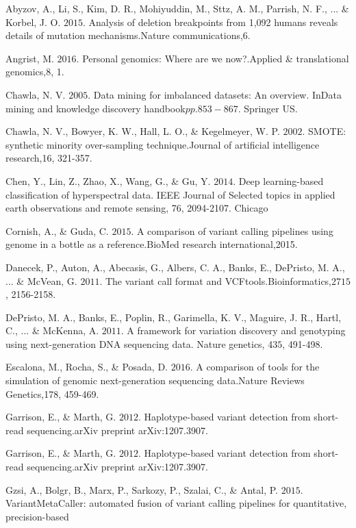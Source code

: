 \documentclass{article}
\begin{document}
\begin{list}{}{%
\setlength{\topsep}{0pt}%
\setlength{\leftmargin}{0.5in}%
\setlength{\listparindent}{-0.5in}%
\setlength{\itemindent}{-0.5in}%
\setlength{\parsep}{\parskip}%
}
\item[]\item[] Abyzov, A., Li, S., Kim, D. R., Mohiyuddin, M., Sttz, A. M., Parrish, N. F., ... \& Korbel, J. O. \(2015\). Analysis of deletion breakpoints from 1,092 humans reveals details of mutation mechanisms.Nature communications,6.\\\item[] Angrist, M. \(2016\). Personal genomics: Where are we now?.Applied \& translational genomics,8, 1.\\\item[] Chawla, N. V. \(2005\). Data mining for imbalanced datasets: An overview. InData mining and knowledge discovery handbook\(pp. 853-867\). Springer US.\\\item[] Chawla, N. V., Bowyer, K. W., Hall, L. O., \& Kegelmeyer, W. P. \(2002\). SMOTE: synthetic minority over-sampling technique.Journal of artificial intelligence research,16, 321-357.\\\item[] Chen, Y., Lin, Z., Zhao, X., Wang, G., \& Gu, Y. \(2014\). Deep learning-based classification of hyperspectral data. IEEE Journal of Selected topics in applied earth observations and remote sensing, 7\(6\), 2094-2107. Chicago \\\item[] Cornish, A., \& Guda, C. \(2015\). A comparison of variant calling pipelines using genome in a bottle as a reference.BioMed research international,2015.\\\item[] Danecek, P., Auton, A., Abecasis, G., Albers, C. A., Banks, E., DePristo, M. A., ... \& McVean, G. \(2011\). The variant call format and VCFtools.Bioinformatics,27\(15\), 2156-2158.\\\item[] DePristo, M. A., Banks, E., Poplin, R., Garimella, K. V., Maguire, J. R., Hartl, C., ... \& McKenna, A. \(2011\). A framework for variation discovery and genotyping using next-generation DNA sequencing data. Nature genetics, 43\(5\), 491-498.\\\item[] Escalona, M., Rocha, S., \& Posada, D. \(2016\). A comparison of tools for the simulation of genomic next-generation sequencing data.Nature Reviews Genetics,17\(8\), 459-469.\\\item[] Garrison, E., \& Marth, G. \(2012\). Haplotype-based variant detection from short-read sequencing.arXiv preprint arXiv:1207.3907.\\\item[] Garrison, E., \& Marth, G. \(2012\). Haplotype-based variant detection from short-read sequencing.arXiv preprint arXiv:1207.3907.\\\item[] Gzsi, A., Bolgr, B., Marx, P., Sarkozy, P., Szalai, C., \& Antal, P. \(2015\). VariantMetaCaller: automated fusion of variant calling pipelines for quantitative, precision-based 
\end{list}
\end{document}
